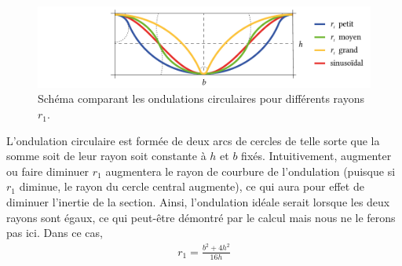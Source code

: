 \documentclass[11pt,titlepage]{article}
\begin{document}
\begin{figure}[H]
    \centering
    \includegraphics[width=0.8\linewidth]{img/ondul/circ2.pdf}
    \caption{Schéma comparant les ondulations circulaires pour différents rayons $r_1$.}
    \label{fig:ondcirc2}
\end{figure}
L'ondulation circulaire est formée de deux arcs de cercles de telle sorte que la somme soit de leur rayon soit constante à $h$ et $b$ fixés. Intuitivement, augmenter ou faire diminuer $r_1$ augmentera le rayon de courbure de l'ondulation (puisque si $r_1$ diminue, le rayon du cercle central augmente), ce qui aura pour effet de diminuer l'inertie de la section. Ainsi, l'ondulation idéale serait lorsque les deux rayons sont égaux, ce qui peut-être démontré par le calcul mais nous ne le ferons pas ici. Dans ce cas, 
\begin{align}
    r_1 = \frac{b^2+4h^2}{16h}
\end{align}
\end{document}
